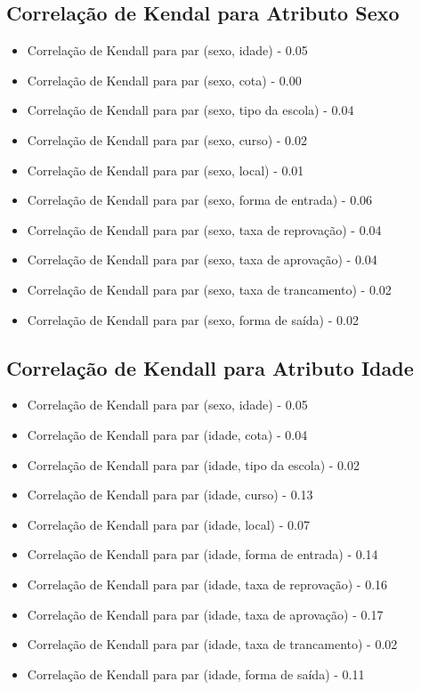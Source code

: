 \subsection{Correlação de Kendal para Atributo Sexo}
\begin{itemize}
    \item Correlação de Kendall para par (sexo, idade) - 0.05
    \item Correlação de Kendall para par (sexo, cota) - 0.00
    \item Correlação de Kendall para par (sexo, tipo da escola) - 0.04
    \item Correlação de Kendall para par (sexo, curso) - 0.02
    \item Correlação de Kendall para par (sexo, local) - 0.01
    \item Correlação de Kendall para par (sexo, forma de entrada) - 0.06
    \item Correlação de Kendall para par (sexo, taxa de reprovação) - 0.04
    \item Correlação de Kendall para par (sexo, taxa de aprovação) - 0.04
    \item Correlação de Kendall para par (sexo, taxa de trancamento) - 0.02
    \item Correlação de Kendall para par (sexo, forma de saída) - 0.02
\end{itemize}

\subsection{Correlação de Kendall para Atributo Idade}
\begin{itemize}
    \item Correlação de Kendall para par (sexo, idade) - 0.05
    \item Correlação de Kendall para par (idade, cota) - 0.04
    \item Correlação de Kendall para par (idade, tipo da escola) - 0.02
    \item Correlação de Kendall para par (idade, curso) - 0.13
    \item Correlação de Kendall para par (idade, local) - 0.07
    \item Correlação de Kendall para par (idade, forma de entrada) - 0.14
    \item Correlação de Kendall para par (idade, taxa de reprovação) - 0.16
    \item Correlação de Kendall para par (idade, taxa de aprovação) - 0.17
    \item Correlação de Kendall para par (idade, taxa de trancamento) - 0.02
    \item Correlação de Kendall para par (idade, forma de saída) - 0.11
\end{itemize}

